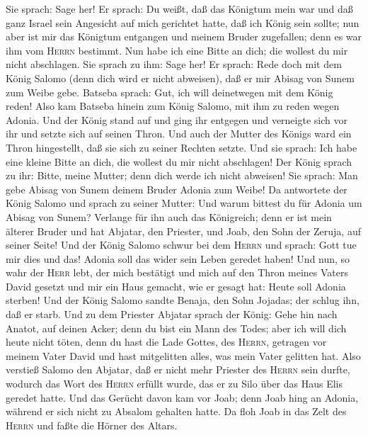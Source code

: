  Sie sprach: Sage her! Er sprach: Du weißt, daß das
Königtum mein war und daß ganz Israel sein Angesicht auf mich gerichtet
hatte, daß ich König sein sollte; nun aber ist mir das Königtum
entgangen und meinem Bruder zugefallen; denn es war ihm vom
\textsc{Herrn} bestimmt.  Nun habe ich eine Bitte an
dich; die wollest du mir nicht abschlagen. Sie sprach zu ihm:
 Sage her! Er sprach: Rede doch mit dem König Salomo
(denn dich wird er nicht abweisen), daß er mir Abisag von Sunem zum
Weibe gebe.  Batseba sprach: Gut, ich will deinetwegen
mit dem König reden!  Also kam Batseba hinein zum König
Salomo, mit ihm zu reden wegen Adonia. Und der König stand auf und ging
ihr entgegen und verneigte sich vor ihr und setzte sich auf seinen
Thron. Und auch der Mutter des Königs ward ein Thron hingestellt, daß
sie sich zu seiner Rechten setzte.  Und sie sprach: Ich
habe eine kleine Bitte an dich, die wollest du mir nicht abschlagen! Der
König sprach zu ihr: Bitte, meine Mutter; denn dich werde ich nicht
abweisen!  Sie sprach: Man gebe Abisag von Sunem deinem
Bruder Adonia zum Weibe!  Da antwortete der König Salomo
und sprach zu seiner Mutter: Und warum bittest du für Adonia um Abisag
von Sunem? Verlange für ihn auch das Königreich; denn er ist mein
älterer Bruder und hat Abjatar, den Priester, und Joab, den Sohn der
Zeruja, auf seiner Seite!  Und der König Salomo schwur
bei dem \textsc{Herrn} und sprach: Gott tue mir dies und das! Adonia
soll das wider sein Leben geredet haben!  Und nun, so
wahr der \textsc{Herr} lebt, der mich bestätigt und mich auf den Thron
meines Vaters David gesetzt und mir ein Haus gemacht, wie er gesagt hat:
Heute soll Adonia sterben!  Und der König Salomo sandte
Benaja, den Sohn Jojadas; der schlug ihn, daß er starb. 
Und zu dem Priester Abjatar sprach der König: Gehe hin nach Anatot, auf
deinen Acker; denn du bist ein Mann des Todes; aber ich will dich heute
nicht töten, denn du hast die Lade Gottes, des \textsc{Herrn}, getragen
vor meinem Vater David und hast mitgelitten alles, was mein Vater
gelitten hat.  Also verstieß Salomo den Abjatar, daß er
nicht mehr Priester des \textsc{Herrn} sein durfte, wodurch das Wort des
\textsc{Herrn} erfüllt wurde, das er zu Silo über das Haus Elis geredet
hatte.  Und das Gerücht davon kam vor Joab; denn Joab
hing an Adonia, während er sich nicht zu Absalom gehalten hatte. Da floh
Joab in das Zelt des \textsc{Herrn} und faßte die Hörner des Altars.
